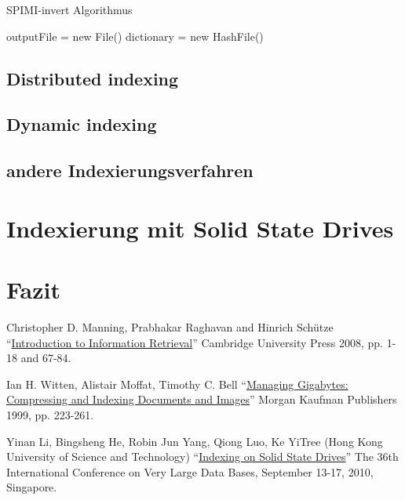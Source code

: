 \begin{algorithm}
\caption{SPIMI-invert Algorithmus}
 outputFile = new File()\;
 dictionary = new HashFile()\;
\end{algorithm}

\subsection{Distributed indexing}
\subsection{Dynamic indexing}
\subsection{andere Indexierungsverfahren}



\section{Indexierung mit Solid State Drives} \label{indexSSD}

\section{Fazit}

\begin{thebibliography}{9}

		Christopher D. Manning, Prabhakar Raghavan and Hinrich Schütze \enquote{\href{https://nlp.stanford.edu/IR-book/pdf/04const.pdf}{Introduction to Information Retrieval}}  Cambridge University Press 2008, pp. 1-18 and 67-84.

	  Ian H. Witten, Alistair Moffat, Timothy C. Bell \enquote{\href{https://books.google.de/books?id=2F74jyPl48EC&dq=Witten+et+al.+index+1999&lr=&hl=de&source=gbs_navlinks_s}{Managing Gigabytes: Compressing and Indexing Documents and Images}}  Morgan Kaufman Publishers 1999, pp. 223-261.
	
	Yinan Li, Bingsheng He, Robin Jun Yang, Qiong Luo, Ke YiTree (Hong Kong University of Science and Technology) \enquote{\href{http://pages.cs.wisc.edu/~yinan/paper/fdtree_pvldb.pdf}{Indexing on Solid State Drives}} The 36th International Conference on Very Large Data Bases, September 13-17,
2010, Singapore.
\end{thebibliography}
